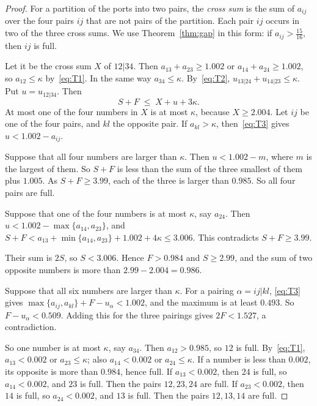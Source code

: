 \begin{proof}
For a partition of the ports into two pairs, the \emph{cross sum} is the sum of $a_{ij}$ over the
four pairs $ij$ that are not pairs of the partition. Each pair $ij$ occurs in two of the three
cross sums. We use Theorem~\ref{thm:gap} in this form: if $a_{ij}>\frac{15}{16}$, then $ij$ is
full.

 Let it be the cross sum $X$ of $12|34$. Then
$a_{13}+a_{23}\ge1.002$ or $a_{14}+a_{24}\ge1.002$, so $a_{12}\le\kappa$ by~\eqref{eq:T1}. In the
same way $a_{34}\le\kappa$. By~\eqref{eq:T2}, $u_{13|24}+u_{14|23}\le\kappa$. Put $u=u_{12|34}$.
Then
\[
  S+F\;\le\;X+u+3\kappa .
\]
At most one of the four numbers in $X$ is at most $\kappa$, because $X\ge2.004$. Let $ij$ be one
of the four pairs, and $kl$ the opposite pair. If $a_{kl}>\kappa$, then~\eqref{eq:T3} gives
$u<1.002-a_{ij}$.

Suppose that all four numbers are larger than $\kappa$. Then $u<1.002-m$, where $m$ is the largest
of them. So $S+F$ is less than the sum of the three smallest of them plus $1.005$. As
$S+F\ge3.99$, each of the three is larger than $0.985$. So all four pairs are full.

Suppose that one of the four numbers is at most $\kappa$, say $a_{24}$. Then
$u<1.002-\max\{a_{14},a_{23}\}$, and
$S+F<a_{13}+\min\{a_{14},a_{23}\}+1.002+4\kappa\le3.006$. This contradicts $S+F\ge3.99$.

 Their sum is $2S$, so $S<3.006$. Hence
$F>0.984$ and $S\ge2.99$, and the sum of two opposite numbers is more than $2.99-2.004=0.986$.

Suppose that all six numbers are larger than $\kappa$. For a pairing $\alpha=ij|kl$,
\eqref{eq:T3} gives $\max\{a_{ij},a_{kl}\}+F-u_\alpha<1.002$, and the maximum is at least $0.493$.
So $F-u_\alpha<0.509$. Adding this for the three pairings gives $2F<1.527$, a contradiction.

So one number is at most $\kappa$, say $a_{34}$. Then $a_{12}>0.985$, so $12$ is full.
By~\eqref{eq:T1}, $a_{13}<0.002$ or $a_{23}\le\kappa$; also $a_{14}<0.002$ or $a_{24}\le\kappa$.
If a number is less than $0.002$, its opposite is more than $0.984$, hence full. If
$a_{13}<0.002$, then $24$ is full, so $a_{14}<0.002$, and $23$ is full. Then the pairs
$12,23,24$ are full. If $a_{23}<0.002$, then $14$ is full, so $a_{24}<0.002$, and $13$ is full.
Then the pairs $12,13,14$ are full.
\end{proof}

